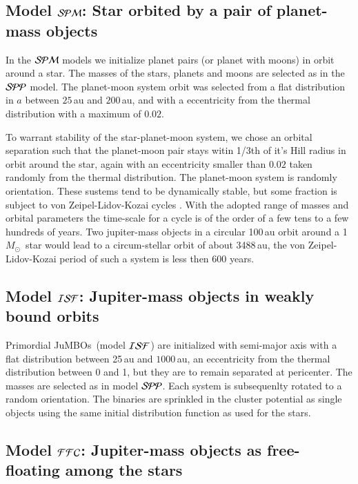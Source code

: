 \documentclass[submission,phys]{lib/SciPost}
\newcommand{\MSun}{\mbox{${M}_\odot$}}
\newcommand{\jumbos}{\mbox{JuMBOs}}
\begin{document}
\subsection{Model ${\cal SPM}$: Star orbited by a pair of planet-mass objects}

In the ${\cal SPM}$ models we initialize planet pairs (or planet with
moons) in orbit around a star. The masses of the stars, planets and
moons are selected as in the ${\cal SPP}$ model.  The planet-moon
system orbit was selected from a flat distribution in $a$ between
$25$\,au and $200$\,au, and with a eccentricity from the thermal
distribution with a maximum of $0.02$.

To warrant stability of the star-planet-moon system, we chose an
orbital separation such that the planet-moon pair stays witin 1/3th of
it's Hill radius in orbit around the star, again with an eccentricity
smaller than $0.02$ taken randomly from the thermal distribution.  The
planet-moon system is randomly orientation.  These sustems tend to be
dynamically stable, but some fraction is subject to von
Zeipel-Lidov-Kozai cycles
\cite{1910AN....183..345V,1962PSS..9..719L,1962AJ.....67..591K}.  With
the adopted range of masses and orbital parameters the time-scale for
a cycle is of the order of a few tens to a few hundreds of years.  Two
jupiter-mass objects in a circular 100\,au orbit around a 1\,\MSun\,
star would lead to a circum-stellar orbit of about 3488\,au, the von
Zeipel-Lidov-Kozai period of such a system is less then 600 years.


\subsection{Model ${\cal ISF}$: Jupiter-mass objects in weakly bound orbits}

Primordial \jumbos\, (model ${\cal ISF}$) are initialized with
semi-major axis with a flat distribution between 25\,au and
$1000$\,au, an eccentricity from the thermal distribution between 0
and 1, but they are to remain separated at pericenter.  The masses are
selected as in model ${\cal SPP}$.  Each system is subsequenlty
rotated to a random orientation.  The binaries are sprinkled in the
cluster potential as single objects using the same initial
distribution function as used for the stars.

\subsection{Model ${\cal FFC}$: Jupiter-mass objects as free-floating among the stars}\label{Sect:FFC}
\end{document}
